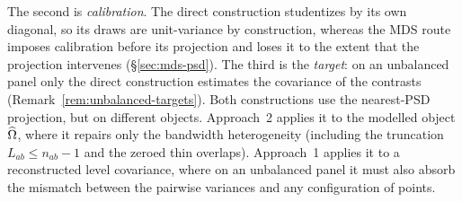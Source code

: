 The second is \emph{calibration}. The direct construction studentizes by its own
diagonal, so its draws are unit-variance by construction, whereas the MDS route imposes
calibration before its projection and loses it to the extent that the projection
intervenes (\S\ref{sec:mds-psd}). The third is the \emph{target}: on an unbalanced
panel only the direct construction estimates the covariance of the contrasts
(Remark~\ref{rem:unbalanced-targets}). Both constructions use the nearest-PSD
projection, but on different objects. Approach~2 applies it to the modelled object
$\widehat{\Omega}$, where it repairs only the bandwidth heterogeneity (including the truncation
$L_{ab}\le n_{ab}-1$ and the zeroed thin overlaps). Approach~1 applies it to a
reconstructed level covariance, where on an unbalanced panel it must also absorb the
mismatch between the pairwise variances and any configuration of points.
